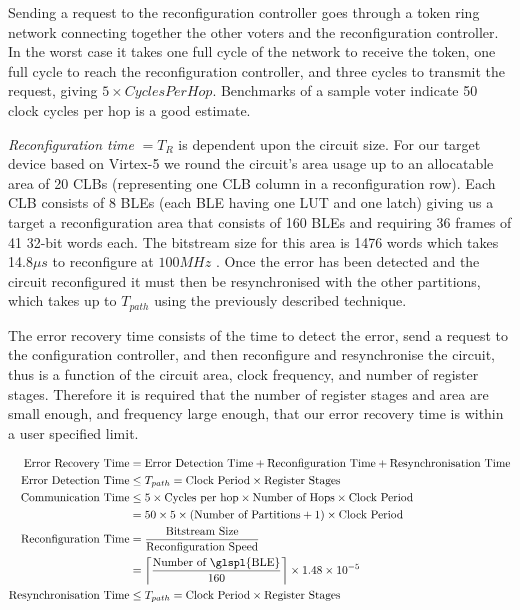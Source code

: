 \documentclass[12pt,final,oneside]{dwThesis} %
\begin{document}
   Sending a request to the reconfiguration controller goes through a token
   ring network connecting together the other voters and the reconfiguration
   controller. In the worst case it takes one full cycle of the network to
   receive the token, one full cycle to reach the reconfiguration controller,
   and three cycles to transmit the request, giving $5\times Cycles Per Hop$.
   Benchmarks of a sample voter indicate 50 clock cycles per hop is a good
   estimate.

   \textit{Reconfiguration time} $= T_R$ is dependent upon the circuit size.
   For our target device based on Virtex-5 we round the circuit's area usage up
   to an allocatable area of 20 \glspl{CLB} (representing one \gls{CLB} column
   in a reconfiguration row). Each \gls{CLB} consists of 8 \glspl{BLE} (each
   \gls{BLE} having one \gls{LUT} and one latch) giving us a target a
   reconfiguration area that consists of 160 \glspl{BLE} and requiring 36
   frames of 41 32-bit words each. The bitstream size for this area is 1476
   words which takes 14.8$\mu{}s$ to reconfigure at $100MHz$
   \cite{XilinxConfigurationUG}.  Once the error has been detected and the
   circuit reconfigured it must then be resynchronised with the other
   partitions, which takes up to $T_{path}$ using the previously described
   technique.

   The error recovery time consists of the time to detect the error, send a
   request to the configuration controller, and then reconfigure and
   resynchronise the circuit, thus is a function of the circuit area, clock
   frequency, and number of register stages. Therefore it is required that the
   number of register stages and area are small enough, and frequency large
   enough, that our error recovery time is within a user specified limit.

   \begin{align}
      \mbox{Error Recovery Time} &=\mbox{Error Detection Time} +
      \mbox{Reconfiguration Time} + \mbox{Resynchronisation Time}\notag\\
      \mbox{Error Detection Time} &\le T_{path} = \mbox{Clock
         Period}\times\mbox{Register Stages}\notag\\
      \mbox{Communication Time}
      &\le 5\times \mbox{Cycles per hop}\times\mbox{Number of Hops}\times \mbox{Clock Period}\notag\\
      &= 50\times 5\times (\mbox{Number of
         Partitions}+1)\times \mbox{Clock Period}\notag\\
      \mbox{Reconfiguration
         Time} &= \frac{\mbox{Bitstream
            Size}}{\mbox{Reconfiguration Speed}}\notag\\
      &=\left\lceil \frac{\mbox{Number of
            \glspl{BLE}}}{160}\right\rceil\times 1.48\times10^{-5}\notag\\
      \mbox{Resynchronisation Time} &\le T_{path} = \mbox{Clock
         Period}\times\mbox{Register Stages}\notag\\
   \end{align}
   
\end{document}
